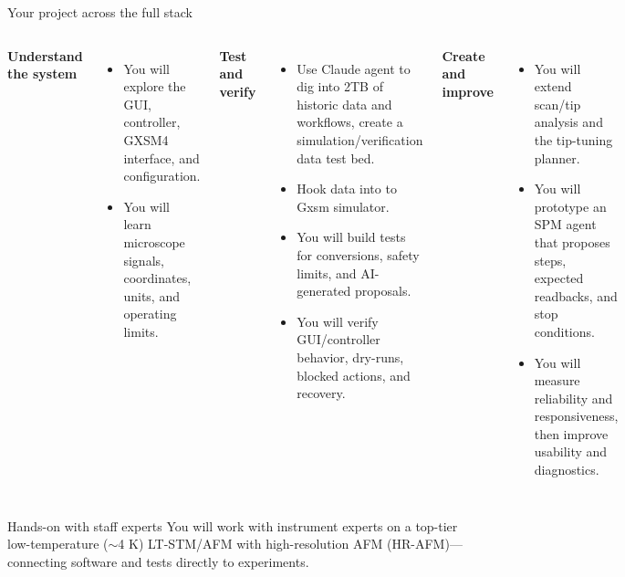 \documentclass[aspectratio=169,11pt]{beamer}
\begin{document}
\begin{frame}{Your project across the full stack}
  \footnotesize
  \begin{columns}[T,onlytextwidth]
      \textbf{Understand the system}
      \begin{itemize}
        \setlength{\itemsep}{0pt}\setlength{\topsep}{0pt}
          \item You will explore the GUI, controller, GXSM4 interface, and configuration.
          \item You will learn microscope signals, coordinates, units, and operating limits.
      \end{itemize}
      \textbf{Test and verify}
      \begin{itemize}
        \setlength{\itemsep}{0pt}\setlength{\topsep}{0pt}
        \item Use Claude agent to dig into 2TB of historic data and workflows, create a simulation/verification data test bed.
        \item Hook data into to Gxsm simulator.
        \item You will build tests for conversions, safety limits, and AI-generated proposals.
        \item You will verify GUI/controller behavior, dry-runs, blocked actions, and recovery.
      \end{itemize}
      \textbf{Create and improve}
      \begin{itemize}
        \setlength{\itemsep}{0pt}\setlength{\topsep}{0pt}
        \item You will extend scan/tip analysis and the tip-tuning planner.
        \item You will prototype an SPM agent that proposes steps, expected readbacks, and stop conditions.
        \item You will measure reliability and responsiveness, then improve usability and diagnostics.
      \end{itemize}
  \end{columns}
  \vspace{0.1em}
  \begin{block}{Hands-on with staff experts}
    \footnotesize
    You will work with instrument experts on a top-tier low-temperature ($\sim$4 K)
    LT-STM/AFM with high-resolution AFM (HR-AFM)—connecting software and tests
    directly to experiments.
  \end{block}
\end{frame}
\end{document}
